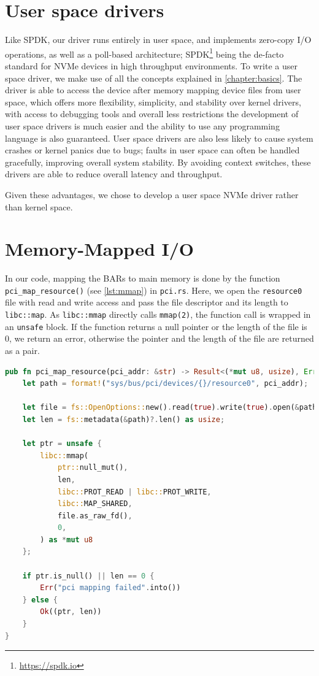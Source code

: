\section{User space drivers}
Like SPDK, our driver runs entirely in user space, and implements zero-copy I/O operations, as well as a poll-based architecture; SPDK\footnote{\url{https://spdk.io}} being the de-facto standard for NVMe devices in high throughput environments. To write a user space driver, we make use of all the concepts explained in \autoref{chapter:basics}. The driver is able to access the device after memory mapping device files from user space, which offers more flexibility, simplicity, and stability over kernel drivers, with access to debugging tools and overall less restrictions the development of user space drivers is much easier and the ability to use any programming language is also guaranteed. User space drivers are also less likely to cause system crashes or kernel panics due to bugs; faults in user space can often be handled gracefully, improving overall system stability. By avoiding context switches, these drivers are able to reduce overall latency and throughput.

Given these advantages, we chose to develop a user space NVMe driver rather than kernel space.

\section{Memory-Mapped I/O}

In our code, mapping the BARs to main memory is done by the function \texttt{pci\_map\_resource()} (see \autoref{lst:mmap}) in \texttt{pci.rs}. Here, we open the \texttt{resource0} file with read and write access and pass the file descriptor and its length to \texttt{libc::map}. As \texttt{libc::mmap} directly calls \texttt{mmap(2)}, the function call is wrapped in an \texttt{unsafe} block. If the function returns a null pointer or the length of the file is 0, we return an error, otherwise the pointer and the length of the file are returned as a pair.

\begin{lstlisting}[float, language=Rust,label=lst:mmap,caption=Memory mapping a PCI resource in Rust]
pub fn pci_map_resource(pci_addr: &str) -> Result<(*mut u8, usize), Error> {
    let path = format!("sys/bus/pci/devices/{}/resource0", pci_addr);

    let file = fs::OpenOptions::new().read(true).write(true).open(&path)?;
    let len = fs::metadata(&path)?.len() as usize;

    let ptr = unsafe {
        libc::mmap(
            ptr::null_mut(),
            len,
            libc::PROT_READ | libc::PROT_WRITE,
            libc::MAP_SHARED,
            file.as_raw_fd(),
            0,
        ) as *mut u8
    };

    if ptr.is_null() || len == 0 {
        Err("pci mapping failed".into())
    } else {
        Ok((ptr, len))
    }
}
\end{lstlisting}

